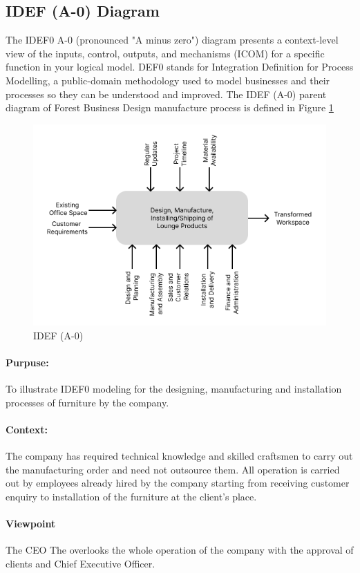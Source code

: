 \subsection{IDEF (A-0) Diagram}
The IDEF0 A-0 (pronounced "A minus zero") diagram presents a context-level
view of the inputs, control, outputs, and mechanisms (ICOM) for a specific function in
your logical model. DEF0 stands for Integration Definition for Process Modelling, a
public-domain methodology used to model businesses and their processes so they
can be understood and improved.
The IDEF (A-0) parent diagram of Forest Business Design manufacture
process is defined in Figure \ref{figure:idef_a_0}
\begin{figure}[!h]
    \centering
    \includegraphics[scale=0.5]{IDEF (A-0).png}
    \caption{IDEF (A-0)}
    \label{figure:idef_a_0}
\end{figure}
\paragraph*{Purpuse:}
To illustrate IDEF0 modeling for the designing, manufacturing and installation processes of furniture
by the company.
\paragraph*{Context:}
The company has required technical knowledge and skilled craftsmen to
carry out the manufacturing order and need not outsource them. All operation is
carried out by employees already hired by the company starting from receiving
customer enquiry to installation of the furniture at the client's place.
\paragraph*{Viewpoint}
The CEO The overlooks the whole operation of the company with the
approval of clients and Chief Executive Officer.

